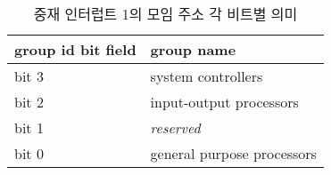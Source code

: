 %
%
\begin{table}[htbp]
\caption{중재 인터럽트 1의 모임 주소 각 비트별 의미}\label{table:group-id}
   \begin{center}
   \begin{tabular}{|l|l|} \hline
	group id bit field & group name \\
\hline \hline
	bit 3 & system controllers \\
	bit 2 & input-output processors \\
	bit 1 & {\it reserved} \\
	bit 0 & general purpose processors \\
\hline
   \end{tabular}
   \end{center}
\end{table}
%
%
